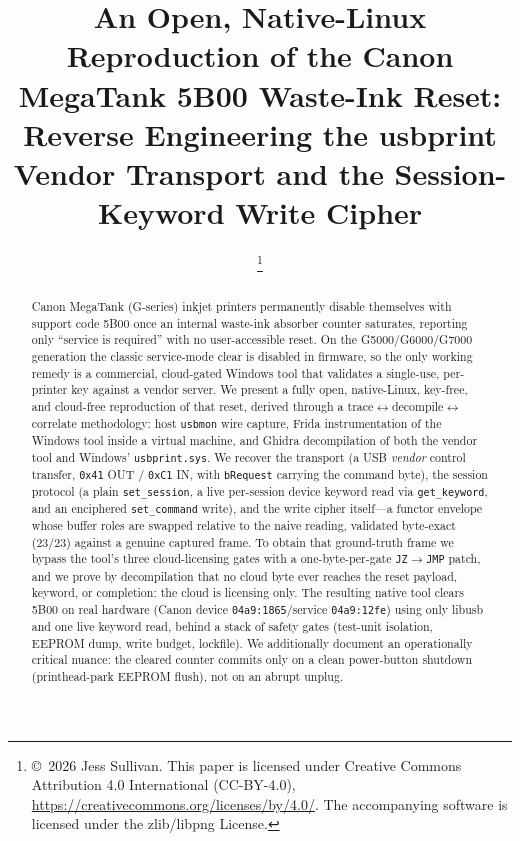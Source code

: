 \documentclass[conference]{IEEEtran}
\begin{document}
\title{An Open, Native-Linux Reproduction of the Canon MegaTank
5B00 Waste-Ink Reset: Reverse Engineering the usbprint Vendor Transport
and the Session-Keyword Write Cipher}

\author{
%
\thanks{\copyright\ 2026 Jess Sullivan. This paper is licensed under
Creative Commons Attribution 4.0 International (CC-BY-4.0),
\url{https://creativecommons.org/licenses/by/4.0/}. The accompanying
software is licensed under the zlib/libpng License.}}

\maketitle

\begin{abstract}
Canon MegaTank (G-series) inkjet printers permanently disable themselves
with support code 5B00 once an internal waste-ink absorber counter
saturates, reporting only ``service is required'' with no user-accessible
reset. On the G5000/G6000/G7000 generation the classic service-mode clear
is disabled in firmware, so the only working remedy is a commercial,
cloud-gated Windows tool that validates a single-use, per-printer key
against a vendor server. We present a fully open, native-Linux,
key-free, and cloud-free reproduction of that reset, derived through a
trace$\leftrightarrow$decompile$\leftrightarrow$correlate methodology:
host \texttt{usbmon} wire capture, Frida instrumentation of the Windows
tool inside a virtual machine, and Ghidra decompilation of both the
vendor tool and Windows' \texttt{usbprint.sys}. We recover the transport
(a USB \emph{vendor} control transfer, \texttt{0x41} OUT / \texttt{0xC1}
IN, with \texttt{bRequest} carrying the command byte), the session
protocol (a plain \texttt{set\_session}, a live per-session device
keyword read via \texttt{get\_keyword}, and an enciphered
\texttt{set\_command} write), and the write cipher itself---a functor
envelope whose buffer roles are swapped relative to the naive reading,
validated byte-exact (23/23) against a genuine captured frame. To obtain
that ground-truth frame we bypass the tool's three cloud-licensing gates
with a one-byte-per-gate \texttt{JZ}$\rightarrow$\texttt{JMP} patch, and
we prove by decompilation that no cloud byte ever reaches the reset
payload, keyword, or completion: the cloud is licensing only. The
resulting native tool clears 5B00 on real hardware (Canon device
\texttt{04a9:1865}/service \texttt{04a9:12fe}) using only libusb and one
live keyword read, behind a stack of safety gates (test-unit isolation,
EEPROM dump, write budget, lockfile). We additionally document an
operationally critical nuance: the cleared counter commits only on a
clean power-button shutdown (printhead-park EEPROM flush), not on an
abrupt unplug.
\end{abstract}
\end{document}
